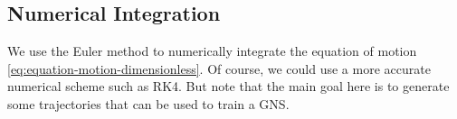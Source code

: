 \documentclass[letterpaper, 11pt]{article}
\begin{document}
\subsection{Numerical Integration}
We use the Euler method to numerically integrate the equation of motion \eqref{eq:equation-motion-dimensionless}. Of course, we could use a more accurate numerical scheme such as RK4. But note that the main goal here is to generate some trajectories that can be used to train a GNS.
\end{document}
